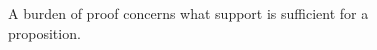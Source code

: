 \begin{figure}[H]
\centering
{}
\caption{A burden of proof concerns what support is sufficient for a proposition.}\label{fig:teach-M05-05}
\end{figure}
